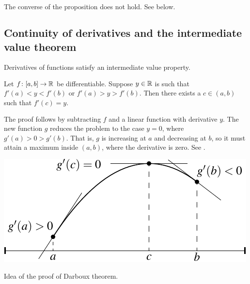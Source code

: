 The converse of the proposition does not hold.  See
 below.

\subsection{Continuity of derivatives and the intermediate value theorem}

Derivatives of functions satisfy an
intermediate value property.

\begin{thm}[Darboux] \label{thm:darboux} 
Let $f \colon [a,b] \to {\mathbb{R}}$ be differentiable.  Suppose $y \in {\mathbb{R}}$ is such
that $f'(a) < y < f'(b)$ or
$f'(a) > y > f'(b)$.  Then there exists a $c \in (a,b)$ such that $f'(c) =
y$.
\end{thm}

The proof follows by subtracting $f$ and a linear function with derivative
$y$.  The new function $g$ reduces the problem
to the case $y=0$, where $g'(a) > 0 > g'(b)$.  That is, $g$ is increasing at $a$ and
decreasing at $b$, so it must attain a maximum inside $(a,b)$,
where the derivative is zero.  See .

\begin{myfigureht}
\includegraphics{figures/darbouxthmfig}
\caption{Idea of the proof of Darboux theorem.\label{darbouxthmfig}}
\end{myfigureht}

